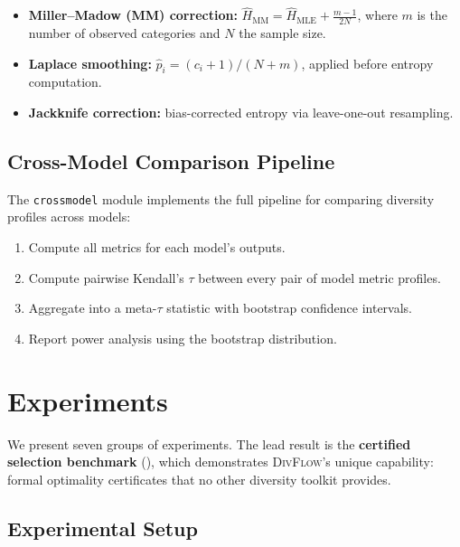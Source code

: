 \documentclass[11pt,a4paper]{article}
\newcommand{\divflow}{\textsc{DivFlow}}
\begin{document}
\begin{itemize}[leftmargin=2em,itemsep=2pt]
\item \textbf{Miller--Madow (MM) correction:}
      $\hat{H}_{\mathrm{MM}} = \hat{H}_{\mathrm{MLE}}
      + \frac{m-1}{2N}$, where $m$ is the number of
      observed categories and $N$ the sample size.
\item \textbf{Laplace smoothing:}
      $\hat{p}_i = (c_i + 1) / (N + m)$, applied before
      entropy computation.
\item \textbf{Jackknife correction:} bias-corrected
      entropy via leave-one-out resampling.
\end{itemize}

\subsection{Cross-Model Comparison Pipeline}

The \texttt{crossmodel} module implements the full
pipeline for comparing diversity profiles across models:

\begin{enumerate}[leftmargin=2em,itemsep=2pt]
\item Compute all metrics for each model's outputs.
\item Compute pairwise Kendall's $\tau$ between every
      pair of model metric profiles.
\item Aggregate into a meta-$\tau$ statistic with
      bootstrap confidence intervals.
\item Report power analysis using the bootstrap
      distribution.
\end{enumerate}

\section{Experiments}\label{sec:experiments}

We present seven groups of experiments.  The lead result is the
\textbf{certified selection benchmark} (),
which demonstrates \divflow{}'s unique capability: formal
optimality certificates that no other diversity toolkit provides.

\subsection{Experimental Setup}
\end{document}
